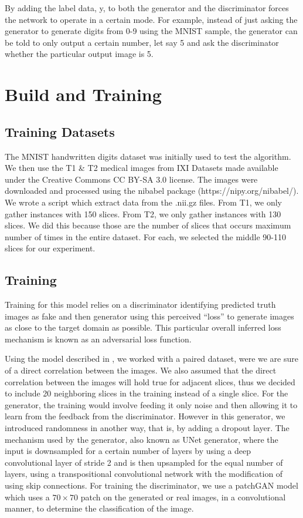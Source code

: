 \documentclass[conference]{IEEEtran}
\begin{document}
By adding the label data, y, to both the generator and the discriminator forces the network to operate in a certain mode. For example, instead of just asking the generator to generate digits from 0-9 using the MNIST sample, the generator can be told to only output a certain number, let say 5 and ask the discriminator whether the particular output image is 5.

\section{Build and Training}

\subsection{Training Datasets}

The MNIST handwritten digits dataset was initially used to test the algorithm. We then use the T1 \& T2 medical images from IXI Datasets \cite{dataset_ixi} made available under the Creative Commons CC BY-SA 3.0 license. The images were downloaded and processed using the nibabel package (https://nipy.org/nibabel/). We wrote a script which extract data from the .nii.gz files. From T1, we only gather instances with 150 slices. From T2, we only gather instances with 130 slices. We did this because those are the number of slices that occurs maximum number of times in the entire dataset. For each, we selected the middle 90-110 slices for our experiment.

\subsection{Training}
Training for this model relies on a discriminator identifying predicted truth images as fake and then generator using this perceived “loss” to generate images as close to the target domain as possible. This particular overall inferred loss mechanism is known as an adversarial loss function. 

Using the model described in \cite{pix2pix_ml}, we worked with a paired dataset, were we are sure of a direct correlation between the images. We also assumed that the direct correlation between the images will hold true for adjacent slices, thus we decided to include 20 neighboring slices in the training instead of a single slice. For the generator, the training would involve feeding it only noise and then allowing it to learn from the feedback from the discriminator. However in this generator, we introduced randomness in another way, that is, by adding a dropout layer. The mechanism used by the generator, also known as UNet generator, where the input is downsampled for a certain number of layers by using a deep convolutional layer of stride 2 and is then upsampled for the equal number of layers, using a transpositional convolutional network with the modification of using skip connections. For training the discriminator, we use a patchGAN model\cite{pix2pix_ml} which uses a $70 \times 70$ patch on the generated or real images, in a convolutional manner, to determine the classification of the image.
\end{document}
